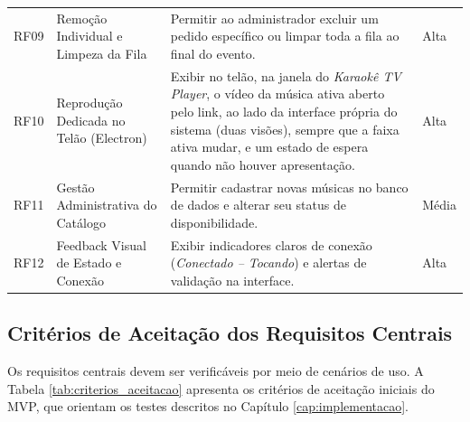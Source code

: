 \begin{table}[H]
{\begin{tabularx}{\textwidth}{p{1.4cm}p{3.4cm}X p{1.8cm}}
    \addlinespace
    RF09 & Remoção Individual e Limpeza da Fila & Permitir ao administrador excluir um pedido específico ou limpar toda a fila ao final do evento. & Alta \\
    \addlinespace
    RF10 & Reprodução Dedicada no Telão (Electron) & Exibir no telão, na janela do \textit{Karaokê TV Player}, o vídeo da música ativa aberto pelo link, ao lado da interface própria do sistema (duas visões), sempre que a faixa ativa mudar, e um estado de espera quando não houver apresentação. & Alta \\
    \addlinespace
    RF11 & Gestão Administrativa do Catálogo & Permitir cadastrar novas músicas no banco de dados e alterar seu status de disponibilidade. & Média \\
    \addlinespace
    RF12 & Feedback Visual de Estado e Conexão & Exibir indicadores claros de conexão (\textit{Conectado -- Tocando}) e alertas de validação na interface. & Alta \\
    \bottomrule
  \end{tabularx}%
}{%
}
\end{table}

\subsection{Critérios de Aceitação dos Requisitos Centrais}

Os requisitos centrais devem ser verificáveis por meio de cenários de uso. A Tabela \ref{tab:criterios_aceitacao} apresenta os critérios de aceitação iniciais do MVP, que orientam os testes descritos no Capítulo \ref{cap:implementacao}.

